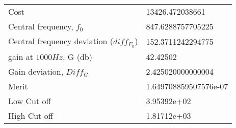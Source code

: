 \begin{table}[H]
    \begin{tabular}{l|l}
    Cost & 13426.472038661\\
    Central frequency, $f_0$ & 847.6288757705225\\
    Central frequency deviation ($diff_{F_0}$) & 152.3711242294775\\
    gain at $1000Hz$, G (db)& 42.42502\\
    Gain deviation, $Diff_G$ & 2.425020000000004\\
    Merit & 1.649708859507576e-07\\
    Low Cut off& 3.95392e+02 \\
    High Cut off& 1.81712e+03\\ 
    \end{tabular}
\end{table}